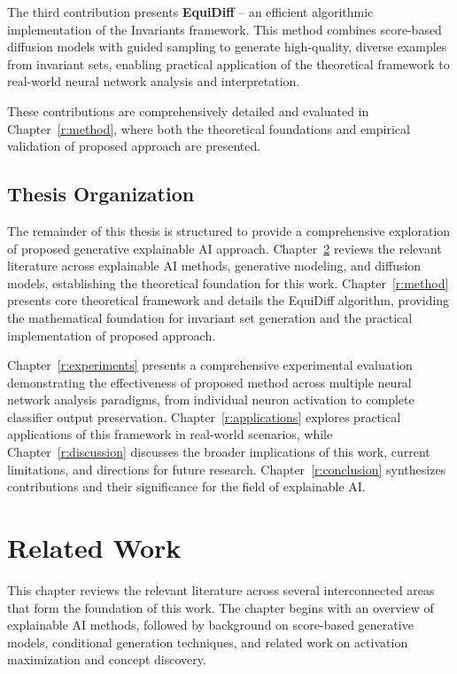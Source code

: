 \documentclass[licencjacka,en]{pracamgr}
\newcommand{\method}[1]{EquiDiff}  %
\newcommand{\framework}[1]{Invariants}  %
\begin{document}
The third contribution presents \textbf{\method{}} -- an efficient algorithmic implementation of the \framework{} framework. This method combines score-based diffusion models with guided sampling to generate high-quality, diverse examples from invariant sets, enabling practical application of the theoretical framework to real-world neural network analysis and interpretation.

These contributions are comprehensively detailed and evaluated in Chapter~\ref{r:method}, where both the theoretical foundations and empirical validation of proposed approach are presented.

\section{Thesis Organization}

The remainder of this thesis is structured to provide a comprehensive exploration of proposed generative explainable AI approach. Chapter~\ref{r:related_work} reviews the relevant literature across explainable AI methods, generative modeling, and diffusion models, establishing the theoretical foundation for this work. Chapter~\ref{r:method} presents core theoretical framework and details the \method{} algorithm, providing the mathematical foundation for invariant set generation and the practical implementation of proposed approach.

Chapter~\ref{r:experiments} presents a comprehensive experimental evaluation demonstrating the effectiveness of proposed method across multiple neural network analysis paradigms, from individual neuron activation to complete classifier output preservation. Chapter~\ref{r:applications} explores practical applications of this framework in real-world scenarios, while Chapter~\ref{r:discussion} discusses the broader implications of this work, current limitations, and directions for future research. Chapter~\ref{r:conclusion} synthesizes contributions and their significance for the field of explainable AI.

\chapter{Related Work}\label{r:related_work}

This chapter reviews the relevant literature across several interconnected areas that form the foundation of this work. The chapter begins with an overview of explainable AI methods, followed by background on score-based generative models, conditional generation techniques, and related work on activation maximization and concept discovery.
\end{document}
